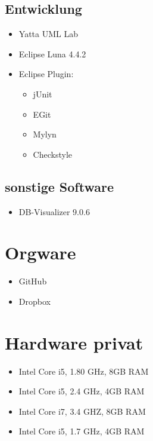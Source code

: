 \documentclass[a4paper]{scrreprt}
\begin{document}
        \subsection{Entwicklung}
           \begin{itemize}
           	\item Yatta UML Lab
           	\item Eclipse Luna 4.4.2
           	\item Eclipse Plugin: \\
	           	\begin{itemize}
	           		\item jUnit
	           		\item EGit
	           		\item Mylyn
	           		\item Checkstyle  
	           	\end{itemize} 
           \end{itemize}
           
        \subsection{sonstige Software}
            \begin{itemize}
            	\item DB-Visualizer 9.0.6
            \end{itemize}
           
    \section{Orgware}
        \begin{itemize}
        	\item GitHub
        	\item Dropbox
        \end{itemize}
        
    \section{Hardware privat}
        \begin{itemize}
        	\item Intel Core i5, 1.80 GHz, 8GB RAM
        	\item Intel Core i5, 2.4 GHz, 4GB RAM
        	\item Intel Core i7, 3.4 GHZ, 8GB RAM
        	\item Intel Core i5, 1.7 GHz, 4GB RAM
        \end{itemize}
            
        
\printnoidxglossaries
\end{document}
